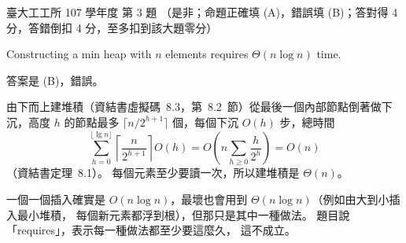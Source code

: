 \begin{pastexam}[label={px:ntu-107-ie-ds-03}]{臺大工工所 107 學年度 第 3 題}
（是非；命題正確填 (A)，錯誤填 (B)；答對得 4 分，答錯倒扣 4 分，至多扣到該大題零分）

Constructing a min heap with $n$ elements requires $\Theta(n\log n)$ time.
\end{pastexam}

\begin{pastsoln}
答案是 (B)，錯誤。

由下而上建堆積（資結書虛擬碼~8.3，第~8.2~節）從最後一個內部節點倒著做下沉，高度 $h$ 的節點最多
$\lceil n / 2^{h+1} \rceil$ 個，每個下沉 $O(h)$ 步，總時間
\[
\sum_{h=0}^{\lfloor \lg n \rfloor} \left\lceil \frac{n}{2^{h+1}} \right\rceil O(h)
= O\!\left(n \sum_{h \ge 0} \frac{h}{2^{h}}\right) = O(n)
\]
（資結書定理~8.1）。 每個元素至少要讀一次，所以建堆積是 $\Theta(n)$。

一個一個插入確實是 $O(n \log n)$，最壞也會用到 $\Theta(n \log n)$（例如由大到小插入最小堆積，
每個新元素都浮到根），但那只是其中一種做法。 題目說「requires」，表示每一種做法都至少要這麼久，
這不成立。
\end{pastsoln}
